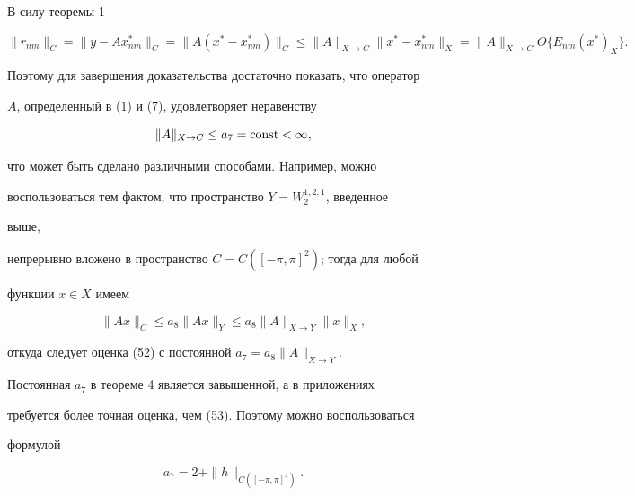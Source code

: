 \begin{pf} 


В силу теоремы 1 


$$


\|r_{nm}\|_C=\|y-Ax^*_{nm}\|_C=\|A(x^*-x^*_{nm})\|_C\le 


\|A\|_{X\to C}\|x^*-x^*_{nm}\|_X=\|A\|_{X\to C} 


O\{E_{nm}(x^*)_X\}. 


$$


Поэтому для завершения доказательства достаточно показать, что оператор 


$A$, определенный в (1) и (7), удовлетворяет неравенству 


\begin{equation} 


\|A\|_{X\to C}\le a_7=\const<\infty, 


\end{equation} 


что может быть сделано различными способами. Например, можно 


воспользоваться тем фактом, что пространство $Y=W^{1,2,1}_2$, введенное 


выше, 


непрерывно вложено в пространство $C=C([-\pi,\pi]^2)$; тогда для любой 


функции $x\in X$ имеем 


\begin{equation} 


\|Ax\|_C\le a_8\|Ax\|_Y\le a_8\|A\|_{X\to Y}\|x\|_X, 


\end{equation} 


откуда следует оценка (52) с постоянной $a_7=a_8\|A\|_{X\to Y}$. 


\end{pf} 


 


Постоянная $a_7$ в теореме 4 является завышенной, а в приложениях 


требуется более точная оценка, чем (53). Поэтому можно воспользоваться 


формулой 


\begin{equation} 


a_7=2+\|h\|_{C([-\pi,\pi]^4)}. 


\end{equation} 


